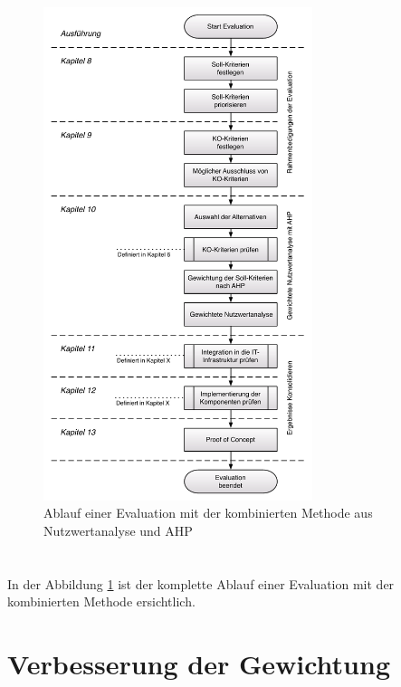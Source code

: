   \begin{figure}[h!]
    \begin{center}
      \includegraphics[width=0.7\textwidth]{./image/kompletterAblaufDerEvaluation.pdf}
      \caption{Ablauf einer Evaluation mit der kombinierten Methode aus Nutzwertanalyse und \ac{AHP}}
      \label{img:ablaufEvaluation}
    \end{center}
  \end{figure}
  
  \section{}
  
  In der Abbildung \ref{img:ablaufEvaluation} ist der komplette Ablauf einer
  Evaluation mit der kombinierten Methode ersichtlich.

  \section{Verbesserung der 
  Gewichtung}\label{subsection:VerbesserungDerGewichtung}
  
